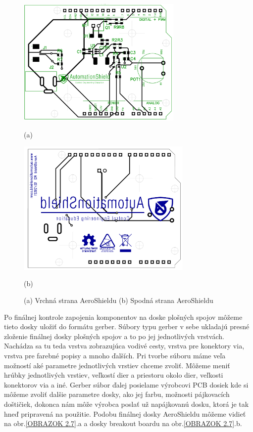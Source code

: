 \begin{figure}[!tbh]
\centering
\includegraphics[width=8cm]{obr/AeroShieldTOP.png}

(a)

\includegraphics[width=8.5cm]{obr/AeroShieldBOTTOM.png}

(b)

\caption{(a) Vrchná strana AeroShieldu (b) Spodná strana AeroShieldu}
\label{OBRAZOK 2.4}
\end{figure}

\newpage

Po finálnej kontrole zapojenia komponentov na doske plošných spojov môžeme tieto dosky uložiť do formátu gerber. Súbory typu gerber v sebe ukladajú presné zloženie finálnej dosky plošných spojov a to po jej jednotlivých vrstvách. Nachádza sa tu teda vrstva zobrazujúca vodivé cesty, vrstva pre konektory via, vrstva pre farebné popisy a mnoho ďalších. Pri tvorbe súboru máme veľa možností aké parametre jednotlivých vrstiev chceme zvoliť. Môžeme meniť hrúbky jednotlivých vrstiev, veľkostí dier a priestoru okolo dier, veľkosti konektorov via a iné. Gerber súbor ďalej posielame výrobcovi PCB dosiek kde si môžeme zvoliť dalšie parametre dosky, ako jej farbu, možnosti pájkovacích doštičiek, dokonca nám môže výrobca poslať už napájkovanú dosku, ktorá je tak hneď pripravená na použitie. Podobu finálnej dosky AeroShieldu môžeme vidieť na obr.\ref{OBRAZOK 2.7}.a a dosky breakout boardu na obr.\ref{OBRAZOK 2.7}.b.


